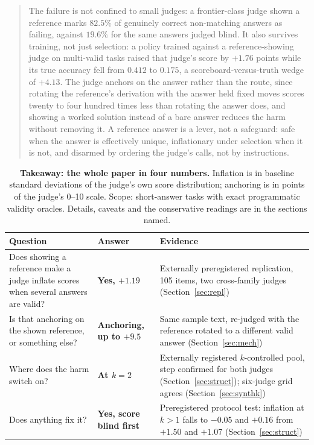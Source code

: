 \documentclass[11pt]{article}
\begin{document}
\begin{abstract}
The failure is not confined to small judges: a frontier-class judge shown a reference marks $82.5\%$ of genuinely correct non-matching answers as failing, against $19.6\%$ for the same answers judged blind.
It also survives training, not just selection: a policy trained against a reference-showing judge on multi-valid tasks raised that judge's score by $+1.76$ points while its true accuracy fell from $0.412$ to $0.175$, a scoreboard-versus-truth wedge of $+4.13$.
The judge anchors on the answer rather than the route, since rotating the reference's derivation with the answer held fixed moves scores twenty to four hundred times less than rotating the answer does, and showing a worked solution instead of a bare answer reduces the harm without removing it.
A reference answer is a lever, not a safeguard: safe when the answer is effectively unique, inflationary under selection when it is not, and disarmed by ordering the judge's calls, not by instructions.
\end{abstract}

\begin{table}[t!]
\centering
\small
\setlength{\tabcolsep}{6pt}
\begin{tabular}{L{5.2cm}L{2.5cm}L{4.3cm}}
\toprule
Question & Answer & Evidence \\
\midrule
Does showing a reference make a judge inflate scores when several answers are valid? &
\textbf{Yes, $+1.19$}  &
Externally preregistered replication, 105 items, two cross-family judges (Section~\ref{sec:repl}) \\
\addlinespace[3pt]
Is that anchoring on the shown reference, or something else? &
\textbf{Anchoring, up to $+9.5$} &
Same sample text, re-judged with the reference rotated to a different valid answer (Section~\ref{sec:mech}) \\
\addlinespace[3pt]
Where does the harm switch on? &
\textbf{At $k{=}2$} &
Externally registered $k$-controlled pool, step confirmed for both judges (Section~\ref{sec:struct}); six-judge grid agrees (Section~\ref{sec:synthk}) \\
\addlinespace[3pt]
Does anything fix it? &
\textbf{Yes, score blind first} &
Preregistered protocol test: inflation at $k{>}1$ falls to $-0.05$ and $+0.16$ from $+1.50$ and $+1.07$ (Section~\ref{sec:struct}) \\
\bottomrule
\end{tabular}
\caption{\textbf{Takeaway: the whole paper in four numbers.} Inflation is in baseline standard deviations of the judge's own score distribution; anchoring is in points of the judge's 0--10 scale. Scope: short-answer tasks with exact programmatic validity oracles. Details, caveats and the conservative readings are in the sections named.}
\label{tab:headline}
\end{table}
\end{document}
